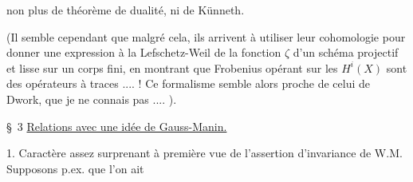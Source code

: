 non plus de théorème de dualité, ni de Künneth. 

(Il semble cependant que malgré cela, ils arrivent à utiliser leur cohomologie pour donner une expression à la Lefschetz-Weil de la fonction $\zeta$ d'un schéma projectif et lisse sur un corps fini, en montrant que  Frobenius opérant sur les $H^i(X)$ sont des opérateurs à traces .... ! Ce formalisme semble alors proche de celui de Dwork, que je ne connais pas .... ).

\S~3  \uline{Relations  avec une idée de Gauss-Manin.}

1. Caractère assez surprenant à première vue de l'assertion d'invariance de W.M. Supposons p.ex. que l'on ait

